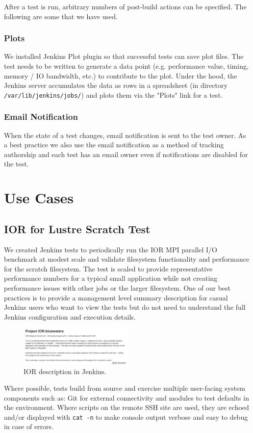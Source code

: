 \documentclass[10pt, conference, compsocconf]{IEEEtran}
\begin{document}
After a test is run, arbitrary numbers of post-build actions can be specified. 
The following are some that we have used. 

\subsubsection{Plots}
We installed Jenkins Plot plugin \cite{JenkinsPlotPlugin} so that successful tests can save plot files. 
The test needs to be written to generate a data point (e.g. performance value, timing, memory / IO bandwidth, etc.) to contribute to the plot. 
Under the hood, the Jenkins server accumulates the data as rows in a spreadsheet (in directory \texttt{/var/lib/jenkins/jobs/}) and plots them via the "Plots" link for a test.

\subsubsection{Email Notification}
When the state of a test changes, email notification is sent to the test owner. 
As a best practice we also use the email notification as a method of tracking authorship and each test has an email owner even if notifications are disabled for the test.

\section{Use Cases}
\label{sec:UseCases}
\subsection{IOR for Lustre Scratch Test}
We created Jenkins tests to periodically run the IOR MPI parallel I/O benchmark at modest scale and validate filesystem functionality and performance for the scratch filesystem. 
The test is scaled to provide representative performance numbers for a typical small application while not creating performance issues with other jobs or the larger filesystem.
One of our best practices is to provide a management level summary description for casual Jenkins users who want to view the tests but do not need to understand the full Jenkins configuration and execution details. 
 
\begin{figure}[H]
\centering
\includegraphics[width=0.5\textwidth]{IOR-bluewaters-descr}
\caption{IOR description in Jenkins.}
\label{fig:IOR-bluewaters-descr}
\end{figure}
Where possible, tests build from source and exercise multiple user-facing system components such as: Git for external connectivity and modules to test defaults in the environment. 
Where scripts on the remote SSH site are used, they are echoed and/or displayed with \texttt{cat -n} to make console output verbose and easy to debug in case of errors. 
 
\end{document}
